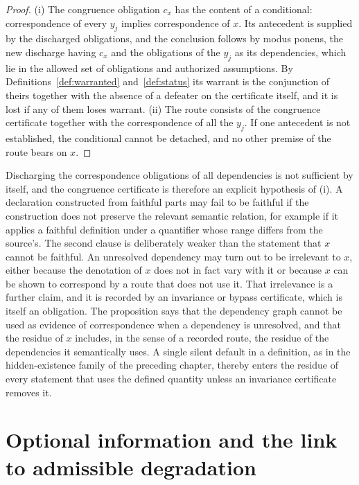 \begin{proof}
(i) The congruence obligation $c_x$ has the content of a conditional: correspondence of every $y_j$ implies correspondence of $x$. Its antecedent is supplied by the discharged obligations, and the conclusion follows by modus ponens, the new discharge having $c_x$ and the obligations of the $y_j$ as its dependencies, which lie in the allowed set of obligations and authorized assumptions. By Definitions~\ref{def:warranted} and~\ref{def:status} its warrant is the conjunction of theirs together with the absence of a defeater on the certificate itself, and it is lost if any of them loses warrant. (ii) The route consists of the congruence certificate together with the correspondence of all the $y_j$. If one antecedent is not established, the conditional cannot be detached, and no other premise of the route bears on $x$.
\end{proof}

Discharging the correspondence obligations of all dependencies is not sufficient by itself, and the congruence certificate is therefore an explicit hypothesis of (i). A declaration constructed from faithful parts may fail to be faithful if the construction does not preserve the relevant semantic relation, for example if it applies a faithful definition under a quantifier whose range differs from the source's. The second clause is deliberately weaker than the statement that $x$ cannot be faithful. An unresolved dependency may turn out to be irrelevant to $x$, either because the denotation of $x$ does not in fact vary with it or because $x$ can be shown to correspond by a route that does not use it. That irrelevance is a further claim, and it is recorded by an invariance or bypass certificate, which is itself an obligation. The proposition says that the dependency graph cannot be used as evidence of correspondence when a dependency is unresolved, and that the residue of $x$ includes, in the sense of a recorded route, the residue of the dependencies it semantically uses. A single silent default in a definition, as in the hidden-existence family of the preceding chapter, thereby enters the residue of every statement that uses the defined quantity unless an invariance certificate removes it.

\section{Optional information and the link to admissible degradation}

